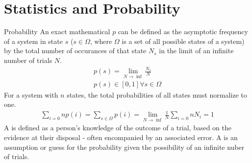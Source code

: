 \chapter{Statistics and Probability}
\thispagestyle{fancy}

\begin{defn}[Probability]{Probability}
An exact mathematical  $p$ can be defined as the asymptotic frequency of a system in state $s$ ($s \in \Omega$, where $\Omega$ is a set of all possible states of a system) by the total number of occurances of that state $N_s$ in the limit of an infinite number of trials $N$.
    \begin{align}
        p(s) = \lim_{N\rightarrow\inf}\frac{N_s}{N} \\
	p(s) \in [0,1] \forall s \in \Omega
    \end{align}
For a system with $n$ states, the total probabilities of all states must normalize to one.
    \begin{align}
        \sum_{i=0}{n}p(i) = \sum_{s \in \Omega}p(i) = \lim_{N\rightarrow\inf}\frac{1}{N}\sum_{i=0}{n}N_i = 1
    \end{align}
A  is defined as a person's knowledge of the outcome of a trial, based on the evidence at their disposal - often encompanied by an associated error. A  is an assumption or guess for the probability given the possibility of an infinite nuber of trials.
\end{defn}

